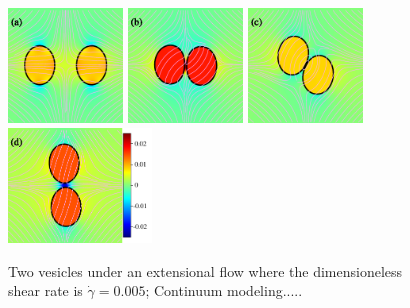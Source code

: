 \documentclass[lineno]{jfm}
\begin{document}
\begin{figure}
\centering
\includegraphics[height=1.2in]{N116_cont_a.pdf}
\includegraphics[height=1.2in]{N116_cont_b.pdf}
\includegraphics[height=1.2in]{N116_cont_c.pdf}
\includegraphics[height=1.2in]{N116_cont_d.pdf}
  \caption{Two vesicles under an extensional flow where the dimensioneless shear rate is $\dot\gamma=0.005$; Continuum modeling.....
  }
    \label{figureB}
\end{figure}
















%
%


%
\end{document}
